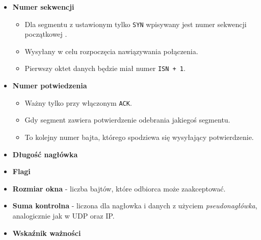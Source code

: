 \documentclass[../sk-egzamin.tex]{subfiles}
\begin{document}
\begin{itemize}
    \item \textbf{Numer sekwencji}
    \begin{itemize}
        \item Dla segmentu z ustawionym tylko \texttt{SYN} wpisywany jest
        numer sekwencji początkowej .
        \item Wysyłany w celu rozpoczęcia nawiązywania połączenia.
        \item Pierwszy oktet danych będzie miał numer \texttt{ISN + 1}.
    \end{itemize}
    \item \textbf{Numer potwiedzenia}
    \begin{itemize}
        \item Ważny tylko przy włączonym \texttt{ACK}.
        \item Gdy segment zawiera potwierdzenie odebrania jakiegoś segmentu.
        \item To kolejny numer bajta, którego spodziewa się wysyłający
        potwierdzenie.
    \end{itemize}
    \item \textbf{Długość nagłówka} 
    \item \textbf{Flagi}
    \item \textbf{Rozmiar okna} - liczba bajtów, które odbiorca może
    zaakceptować.
    \item \textbf{Suma kontrolna} - liczona dla nagłowka i danych z użyciem
    \textit{pseudonagłówka}, analogicznie jak w UDP oraz IP.
    \item \textbf{Wskaźnik ważności}

\end{itemize}
\end{document}
